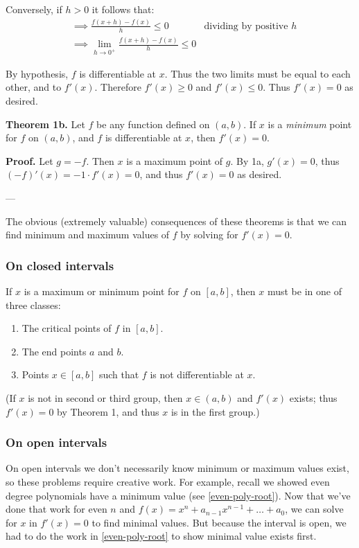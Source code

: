 Conversely, if $h>0$ it follows that:
\begin{align*}
  &\implies \frac{f(x+h)-f(x)}{h}\leq0&\text{dividing by positive $h$}\\
  &\implies \lim_{h\to0^+}\frac{f(x+h)-f(x)}{h}\leq0
\end{align*}

By hypothesis, $f$ is differentiable at $x$. Thus the two limits must
be equal to each other, and to $f'(x)$. Therefore $f'(x)\geq0$ and
$f'(x)\leq0$. Thus $f'(x)=0$ as desired.

\vs

\textbf{Theorem 1b.} Let $f$ be any function defined on $(a,b)$. If
$x$ is a \textit{minimum} point for $f$ on $(a,b)$, and $f$ is
differentiable at $x$, then $f'(x)=0$.

\vs

\textbf{Proof.} Let $g=-f$. Then $x$ is a maximum point of $g$. By 1a,
$g'(x)=0$, thus $(-f)'(x)=-1\cdot f'(x)=0$, and thus $f'(x)=0$ as desired.

\vs---\vs

The obvious (extremely valuable) consequences of these theorems is
that we can find minimum and maximum values of $f$ by solving for
$f'(x)=0$.

\subsubsection*{On closed intervals}
If $x$ is a maximum or minimum point for $f$ on $[a,b]$, then $x$ must
be in one of three classes:
\begin{enumerate}
\item The critical points of $f$ in $[a,b]$.
\item The end points $a$ and $b$.
\item Points $x\in[a,b]$ such that $f$ is not differentiable at $x$.
\end{enumerate}

(If $x$ is not in second or third group, then $x\in(a,b)$ and $f'(x)$
exists; thus $f'(x)=0$ by Theorem 1, and thus $x$ is in the first
group.)

\subsubsection*{On open intervals}

On open intervals we don't necessarily know minimum or maximum values
exist, so these problems require creative work. For example, recall we
showed even degree polynomials have a minimum value (see
\ref{even-poly-root}). Now that we've done that work for even $n$ and
$f(x)=x^{n}+a_{n-1}x^{n-1}+\ldots+a_{0}$, we can solve for $x$ in
$f'(x)=0$ to find minimal values. But because the interval is open, we
had to do the work in \ref{even-poly-root} to show minimal value
exists first.

